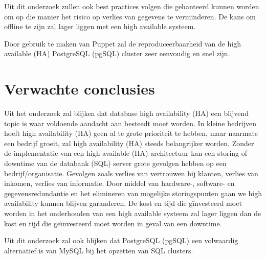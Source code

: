 Uit dit onderzoek zullen ook best practices volgen die gehanteerd kunnen worden om op die manier het risico op verlies van gegevens te verminderen. De kans om offline te zijn zal lager liggen met een high available systeem.

Door gebruik te maken van Puppet zal de reproduceerbaarheid van de high available (HA) PostgreSQL (pgSQL) cluster zeer eenvoudig en snel zijn.



\section{Verwachte conclusies}
\label{sec:verwachte_conclusies}
Uit het onderzoek zal blijken dat database high availability (HA) een blijvend topic is waar voldoende aandacht aan besteedt moet worden. In kleine bedrijven hoeft high availability (HA) geen al te grote prioriteit te hebben, maar naarmate een bedrijf groeit, zal high availability (HA) steeds belangrijker worden. Zonder de implementatie van een high available (HA) architectuur kan een storing of downtime van de databank (SQL) server  grote gevolgen hebben op een bedrijf/organisatie. Gevolgen zoals verlies van vertrouwen bij klanten, verlies van inkomen, verlies van informatie. Door middel van hardware-, software- en gegevensredundantie en het elimineren van mogelijke storingspunten gaan we high availability kunnen blijven garanderen.
De kost en tijd die gïnvesteerd moet worden in het onderhouden van een high available systeem zal lager liggen dan de kost en tijd die geïnvesteerd moet worden in geval van een downtime. 

Uit dit onderzoek zal ook blijken dat PostgreSQL (pgSQL) een volwaardig alternatief is van MySQL bij het opzetten van SQL clusters.

